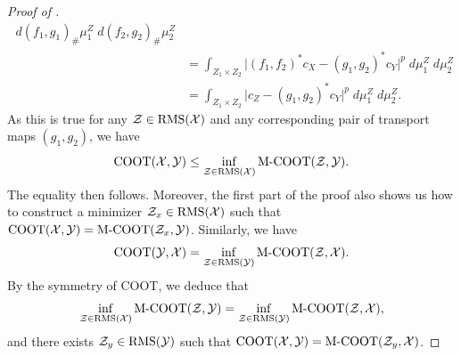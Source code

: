 \begin{proof}[Proof of ]
\begin{align}
    \; d (f_1,g_1)_{\#} \mu_1^Z \; d (f_2,g_2)_{\#} \mu_2^Z \\
    &= \int_{Z_1 \times Z_2} \vert (f_1,f_2)^*c_X - (g_1,g_2)^*c_Y \vert^p \; d\mu_1^Z \; d\mu_2^Z \\
    &= \int_{Z_1 \times Z_2} \vert c_Z - (g_1,g_2)^*c_Y \vert^p \; d\mu_1^Z \; d\mu_2^Z.
  \end{align}
  As this is true for any $\mathcal Z \in \text{RMS}(\mathcal X)$ and any corresponding pair of transport maps
  $(g_1, g_2)$, we have
  \begin{equation}
    \text{COOT}(\mathcal X, \mathcal Y) \leq \inf_{\mathcal Z \in \text{RMS}(\mathcal X)} \text{M-COOT}(\mathcal Z, \mathcal Y).
  \end{equation}
  The equality then follows. Moreover, the first part of the proof also
  shows us how to construct a minimizer $\mathcal Z_x \in \text{RMS}(\mathcal X)$ such that
  $\text{COOT}(\mathcal X, \mathcal Y) = \text{M-COOT}(\mathcal Z_x, \mathcal Y)$. Similarly, we have
  \begin{equation}
    \text{COOT}(\mathcal Y, \mathcal X) = \inf_{\mathcal Z \in \text{RMS}(\mathcal Y)} \text{M-COOT}(\mathcal Z, \mathcal X).
  \end{equation}
  By the symmetry of COOT, we deduce that
  \begin{equation}
    \inf_{\mathcal Z \in \text{RMS}(\mathcal X)} \text{M-COOT}(\mathcal Z, \mathcal Y) = \inf_{\mathcal Z \in \text{RMS}(\mathcal Y)} \text{M-COOT}(\mathcal Z, \mathcal X),
  \end{equation}
  and there exists $\mathcal Z_y \in \text{RMS}(\mathcal Y)$ such that $\text{COOT}(\mathcal X, \mathcal Y) = \text{M-COOT}(\mathcal Z_y, \mathcal X)$.
\end{proof}

